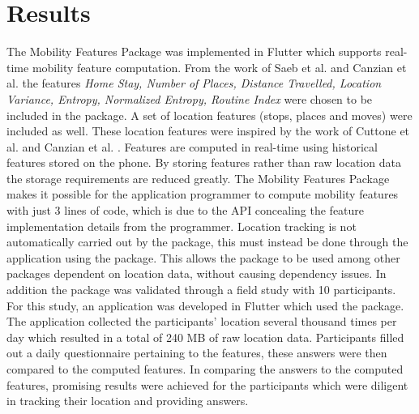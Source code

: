\section{Results}
The Mobility Features Package was implemented in Flutter which supports real-time mobility feature computation. From the work of Saeb et al. \cite{Saeb2015} and Canzian et al. \cite{Canzian2015} the features \textit{Home Stay, Number of Places, Distance Travelled, Location Variance, Entropy, Normalized Entropy, Routine Index} were chosen to be included in the package. A set of location features (stops, places and moves) were included as well. These location features were inspired by the work of Cuttone et al. \cite{sparse-location-2014} and Canzian et al. \cite{Canzian2015}. Features are computed in real-time using historical features stored on the phone. By storing features rather than raw location data the storage requirements are reduced greatly. The Mobility Features Package makes it possible for the application programmer to compute mobility features with just 3 lines of code, which is due to the API concealing the feature implementation details from the programmer. Location tracking is not automatically carried out by the package, this must instead be done through the application using the package. This allows the package to be used among other packages dependent on location data, without causing dependency issues. In addition the package was validated through a field study with 10 participants. For this study, an application was developed in Flutter which used the package. The application collected the participants' location several thousand times per day which resulted in a total of 240 MB of raw location data. Participants filled out a daily questionnaire pertaining to the features, these answers were then compared to the computed features. In comparing the answers to the computed features, promising results were achieved for the participants which were diligent in tracking their location and providing answers. 
